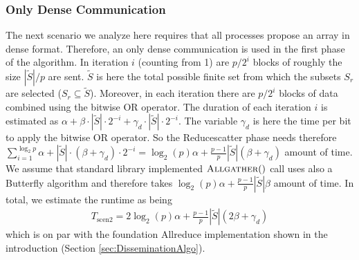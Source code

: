 \subsubsection{Only Dense Communication} \label{sec:UnionButterflyOnlyDenseRuntime}
The next scenario we analyze here requires that all processes propose an array in dense format. Therefore, an only dense communication is used in the first phase of the algorithm. In iteration $i$ (counting from 1) are $p/2^i$ blocks of roughly the size $|\tilde{S}|/p$ are sent. $\tilde{S}$ is here the total possible finite set from which the subsets $S_r$ are selected ($S_r \subseteq \tilde{S}$). Moreover, in each iteration there are $p/2^i$ blocks of data combined using the bitwise OR operator.  The duration of each iteration $i$ is estimated as $\alpha + \beta \cdot|\tilde{S}|\cdot 2^{-i} + \gamma_d \cdot |\tilde{S}|  \cdot 2^{-i} $. The variable $\gamma_d$ is here the time per bit to apply the bitwise OR operator. So the Reducescatter phase needs therefore $\sum_{i=1}^{\log_2{p}} \alpha + |\tilde{S}| \cdot (\beta +\gamma_d)\cdot 2^{-i} = \log_2(p) \alpha + \frac{p-1}{p}|\tilde{S}| (\beta +\gamma_d)$ amount of time. We assume that standard library implemented $\Call{Allgather}{ }$ call uses also a Butterfly algorithm and therefore takes $\log_2(p) \alpha + \frac{p-1}{p}|\tilde{S}|\beta $ amount of time. In total, we estimate the runtime as being 
\begin{align*}
	T_\mathrm{scen2} = 2\log_2(p) \alpha + \frac{p-1}{p}|\tilde{S}| (2\beta +\gamma_d)
\end{align*}
which is on par with the foundation Allreduce implementation shown in the introduction (Section \ref{sec:DisseminationAlgo}).
